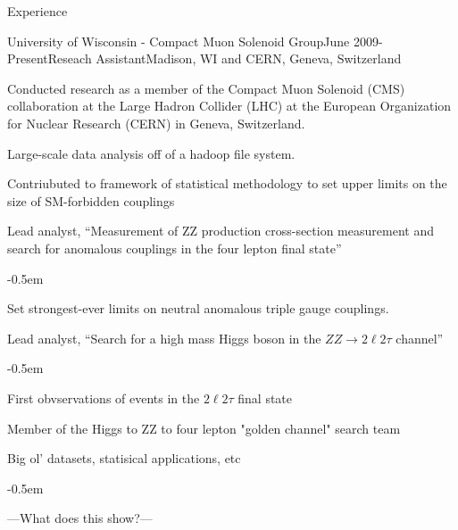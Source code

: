 \documentclass{resume} %
\begin{document}
\begin{rSection}{Experience}


\begin{rSubsection}{University of Wisconsin - Compact Muon Solenoid Group}{June
2009-Present}{Reseach Assistant}{Madison, WI and CERN, Geneva, Switzerland}
\item Conducted research as a member of the Compact Muon Solenoid (CMS)
collaboration at the Large Hadron Collider (LHC) at the European Organization
for Nuclear Research (CERN) in Geneva, Switzerland.
\item Large-scale data analysis off of a hadoop file system.

\item Contriubuted to framework of statistical methodology to set upper
    limits on the size of SM-forbidden couplings

\item Lead analyst, ``Measurement of ZZ production cross-section measurement
    and search for anomalous couplings in the four lepton final state'' 
    \begin{list}{}{\leftmargin=1.5em} 
        \itemsep -0.5em \vspace{-0.5em} %
        \item Set strongest-ever limits on neutral anomalous triple gauge
            couplings.
    \end{list}

\item Lead analyst, ``Search for a high mass Higgs boson in the
    $ZZ\rightarrow 2\ell2\tau$ channel''
    \begin{list}{}{\leftmargin=1.5em} 
      \itemsep -0.5em \vspace{-0.5em} %
      \item First obvservations of events in the $2\ell2\tau$ final state
    \end{list}
\item Member of the Higgs to ZZ to four lepton "golden channel" search team
\item Big ol' datasets, statisical applications, etc

\begin{list}{}{\leftmargin=1.5em} 
  \itemsep -0.5em \vspace{-0.5em} %
  \item ---What does this show?---
\end{list}


\end{rSubsection}
\end{rSection}
\end{document}
